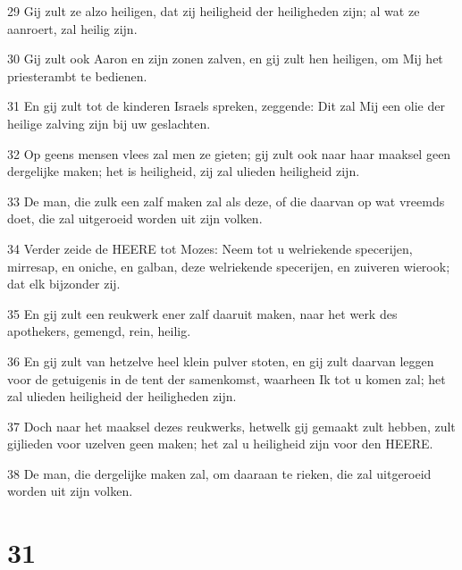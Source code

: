 \par 29 Gij zult ze alzo heiligen, dat zij heiligheid der heiligheden zijn; al wat ze aanroert, zal heilig zijn.
\par 30 Gij zult ook Aaron en zijn zonen zalven, en gij zult hen heiligen, om Mij het priesterambt te bedienen.
\par 31 En gij zult tot de kinderen Israels spreken, zeggende: Dit zal Mij een olie der heilige zalving zijn bij uw geslachten.
\par 32 Op geens mensen vlees zal men ze gieten; gij zult ook naar haar maaksel geen dergelijke maken; het is heiligheid, zij zal ulieden heiligheid zijn.
\par 33 De man, die zulk een zalf maken zal als deze, of die daarvan op wat vreemds doet, die zal uitgeroeid worden uit zijn volken.
\par 34 Verder zeide de HEERE tot Mozes: Neem tot u welriekende specerijen, mirresap, en oniche, en galban, deze welriekende specerijen, en zuiveren wierook; dat elk bijzonder zij.
\par 35 En gij zult een reukwerk ener zalf daaruit maken, naar het werk des apothekers, gemengd, rein, heilig.
\par 36 En gij zult van hetzelve heel klein pulver stoten, en gij zult daarvan leggen voor de getuigenis in de tent der samenkomst, waarheen Ik tot u komen zal; het zal ulieden heiligheid der heiligheden zijn.
\par 37 Doch naar het maaksel dezes reukwerks, hetwelk gij gemaakt zult hebben, zult gijlieden voor uzelven geen maken; het zal u heiligheid zijn voor den HEERE.
\par 38 De man, die dergelijke maken zal, om daaraan te rieken, die zal uitgeroeid worden uit zijn volken.

\chapter{31}

